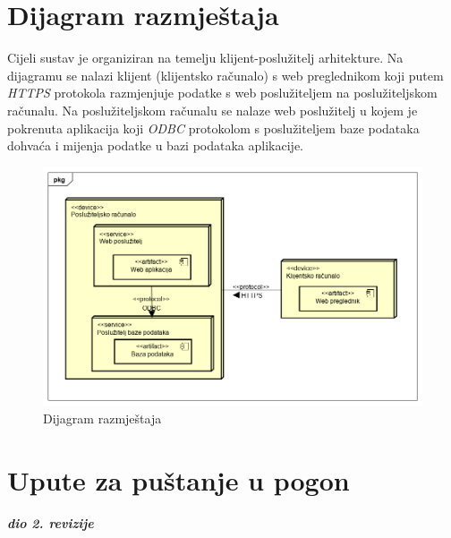 			
			\eject 
		
		
		\section{Dijagram razmještaja}
%			
%			
	
	
		Cijeli sustav je organiziran na temelju klijent-poslužitelj arhitekture. Na dijagramu se nalazi klijent (klijentsko računalo) s web preglednikom koji putem \textit{HTTPS} protokola razmjenjuje podatke s web poslužiteljem na poslužiteljskom računalu. Na poslužiteljskom računalu se nalaze web poslužitelj u kojem je pokrenuta aplikacija koji \textit{ODBC} protokolom s poslužiteljem baze podataka dohvaća i mijenja podatke u bazi podataka aplikacije.
		
		\begin{figure}[h]
			\centering
			\includegraphics[width=1\linewidth]{dijagrami/deployment_diagram}
			\caption{Dijagram razmještaja}
			\label{fig:deploymentdiagram}
		\end{figure}
			
			\eject 
		
		\section{Upute za puštanje u pogon}
		
			\textbf{\textit{dio 2. revizije}}\\
		
